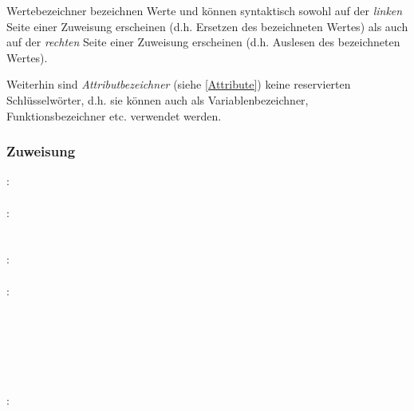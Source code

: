 Wertebezeichner bezeichnen Werte und können syntaktisch sowohl auf der \emph{linken} Seite
einer Zuweisung erscheinen (d.h. Ersetzen des bezeichneten Wertes) als auch auf der
\emph{rechten} Seite einer Zuweisung erscheinen (d.h. Auslesen des bezeichneten Wertes).

Weiterhin sind \emph{Attributbezeichner} (siehe \ref{Attribute}) keine reservierten
Schlüsselwörter, d.h. sie können auch als Variablenbezeichner, Funktionsbezeichner etc.
verwendet werden.


\subsubsection{Zuweisung}\label{Zuweisung}
:\label{asdr_zuweisung}\\
\hspace*{1cm}  \glq\Gt{=}\grq  {} \\
:\label{ausdruck}\\
\hspace*{1cm} \\
\hspace*{1cm} \\
:\label{asdr_wert}\\
\hspace*{1cm} \\
:\label{asdr_basis}\\
\hspace*{1cm}\glq\Gt{(}\grq  {}  \glq\Gt{)}\grq \\
\hspace*{1cm} \\
\hspace*{1cm} \\
\hspace*{1cm} \\
\hspace*{1cm}  \\
\hspace*{1cm} \\
:\label{attribut_liste}\\
\hspace*{1cm}\glq{}\grq  {} \\
\hspace*{1cm}\glq{}\grq  {}  \\

